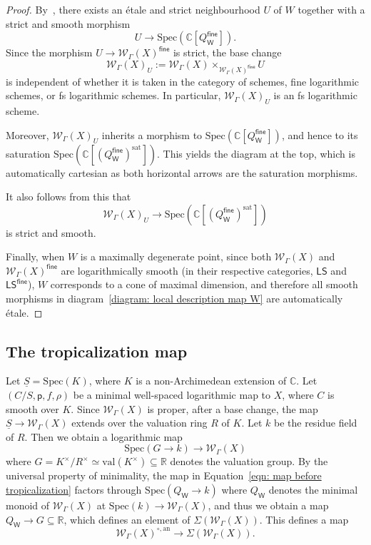 \documentclass{article}
\def\cW{\mathcal{W}}
\def\C{\mathbb{C}}
\def\WG{\mathcal{W}_{\Gamma}}
\newcommand{\sat}{\mathrm{sat}}
\newcommand{\fine}{\mathsf{fine}}
\newcommand{\W}{\mathsf{W}}
\begin{document}
\begin{proof}
    By~\cite[Corollary~3.3.4]{Ogus}, there exists an étale and strict neighbourhood $U$ of $W$ together with a strict and smooth morphism
\[
U \to \mathrm{Spec}(\C[Q_{\W}^{\mathsf{fine}}]).
\]
Since the morphism $U \to \WG(X)^{\fine}$ is strict, the base change
\[
\WG(X)_U := \WG(X) \times_{\WG(X)^{\fine}} U
\]
is independent of whether it is taken in the category of schemes, fine logarithmic schemes, or fs logarithmic schemes. In particular, $\WG(X)_U$ is an fs logarithmic scheme.

Moreover, $\WG(X)_U$ inherits a morphism to $\mathrm{Spec}(\C[Q_{\W}^{\mathsf{fine}}])$, and hence to its saturation $\mathrm{Spec}(\C[(Q_{\W}^{\mathsf{fine}})^{\sat}])$. This yields the diagram at the top, which is automatically cartesian as both horizontal arrows are the saturation morphisms.

It also follows from this that
\[
\WG(X)_U \to \mathrm{Spec}(\C[(Q_{\W}^{\mathsf{fine}})^{\sat}])
\]
is strict and smooth. 

Finally, when $W$ is a maximally degenerate point, since both $\WG(X)$ and $\WG(X)^{\fine}$ are logarithmically smooth (in their respective categories, $\mathsf{LS}$ and $\mathsf{LS}^{\fine}$), $W$ corresponds to a cone of maximal dimension, and therefore all smooth morphisms in diagram~\eqref{diagram: local description map W} are automatically étale.
\end{proof}



\subsection{The tropicalization map}


Let $\underline{S}=\mathrm{Spec}(K)$, where $K$ is a non-Archimedean extension of $\mathbb{C}$. Let $(C/S, \mathsf{p},f,\rho)$ be a minimal well-spaced logarithmic map to $X$, where $C$ is smooth over $K$. Since $\cW_\Gamma(X)$ is proper, after a base change, the map $\underline{S} \to \cW_\Gamma(X)$ extends over the valuation ring $R$ of $K$. Let $k$ be the residue field of $R$. Then we obtain a logarithmic map
\begin{equation}\label{eqn: map before tropicalization}
\mathrm{Spec}(G \to k) \to \cW_\Gamma(X)
\end{equation}
where $G = K^\times/R^\times \simeq \mathrm{val}(K^\times) \subseteq \mathbb{R}$ denotes the valuation group. By the universal property of minimality, the map in Equation~\eqref{eqn: map before tropicalization} factors through  $\mathrm{Spec}(Q_\W \to k)$ where $Q_\W$ denotes the minimal monoid of $\cW_\Gamma(X)$ at $\mathrm{Spec}(k) \to \cW_\Gamma(X)$, and thus we obtain a map $Q_\W \to G \subseteq \mathbb{R}$, which defines an element of $\Sigma(\cW_\Gamma(X))$. This defines a map
$$
\cW_\Gamma(X)^{\circ, \mathrm{an}} \to \Sigma(\cW_{\Gamma}(X)).
$$
\end{document}
